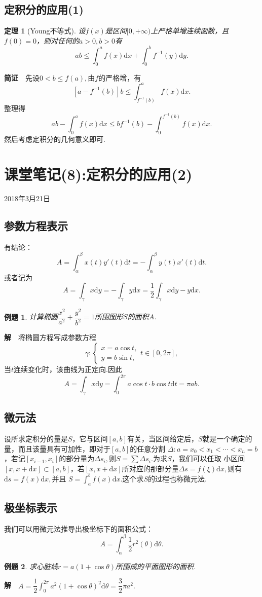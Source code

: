 \documentclass[UTF8]{article}
\newcommand{\dx}{\mathrm{d}x}
\newcommand{\jz}{\textbf{简证}$\quad$}
\newcommand{\jie}{\textbf{解}$\quad$}
\newtheorem{thm}{\hspace{2em}定理}[section]
\newtheorem{exa}{\hspace{2em}例题}[section]
\begin{document}
\subsection{定积分的应用(1)}
\begin{thm}[Young不等式]
  设$f(x)$是区间$[0,+\infty)$上严格单增连续函数，且$f(0)=0$，则对任何的$a>0,b>0$有
  $$ab\le\int_0^af(x)\dx+\int_0^bf^{-1}(y)\mathrm{d}y.$$
\end{thm}
\jz 先设$0<b\le f(a),$由$f$的严格增，有
$$[a-f^{-1}(b)]b\le\int_{f^{-1}(b)}^af(x)\dx.$$整理得
$$ab-\int_0^af(x)\dx\le bf^{-1}(b)-\int_0^{f^{-1}(b)}f(x)\dx.$$然后考虑定积分的几何意义即可.
\clearpage

\section{课堂笔记(8):定积分的应用(2)}
\begin{center}
  2018年3月21日
\end{center}
\subsection{参数方程表示}
有结论：
$$A=\int_\alpha^\beta x(t)y'(t)\mathrm{d}t=-\int_\alpha^\beta y(t)x'(t)\mathrm{d}t.$$或者记为
$$A=\int_\gamma x\mathrm{d}y=-\int_\gamma y\mathrm{d}x=\frac{1}{2}\int_\gamma x\mathrm{d}y-y\mathrm{d}x.$$
\begin{exa}
  计算椭圆$\dfrac{x^2}{a^2}+\dfrac{y^2}{b^2}=1$所围图形$S$的面积$A$.
\end{exa}
\jie 将椭圆方程写成参数方程
\[
\gamma:\begin{cases}
x=a\cos t,\\
y=b\sin t,
\end{cases}t\in[0,2\pi],
\]
当$t$连续变化时，该曲线为正定向.因此
$$A=\int_\gamma x\mathrm{d}y=\int_0^{2\pi}a\cos t\cdot b\cos t\mathrm{d}t=\pi ab.$$
\subsection{微元法}
设所求定积分的量是$S$，它与区间$[a,b]$有关，当区间给定后，$S$就是一个确定的量，而且该量具有可加性，即对于$[a,b]$的任意分割
$\Delta:a=x_0<x_1<\cdots<x_n=b$，若记$[x_{i-1},x_i]$的部分量为$\Delta s_i,$则$S=\sum\Delta s_i$.为求$S$，我们可以任取
小区间$[x,x+\dx]\subset[a,b]$，若$[x,x+\dx]$所对应的那部分量$\Delta s=f(\xi)\dx,$则有$\mathrm{d}s=f(x)\dx,$并且
$S=\int_a^bf(x)\dx$.这个求$S$的过程也称微元法.
\subsection{极坐标表示}
我们可以用微元法推导出极坐标下的面积公式：
$$A=\int_\alpha^\beta\frac{1}{2}r^2(\theta)\mathrm{d}\theta.$$
\begin{exa}
  求心脏线$r=a(1+\cos\theta)$所围成的平面图形的面积.
\end{exa}
\jie $A=\dfrac{1}{2}\int_0^{2\pi}a^2(1+\cos\theta)^2\mathrm{d}\theta=\dfrac{3}{2}\pi a^2.$
\end{document}
